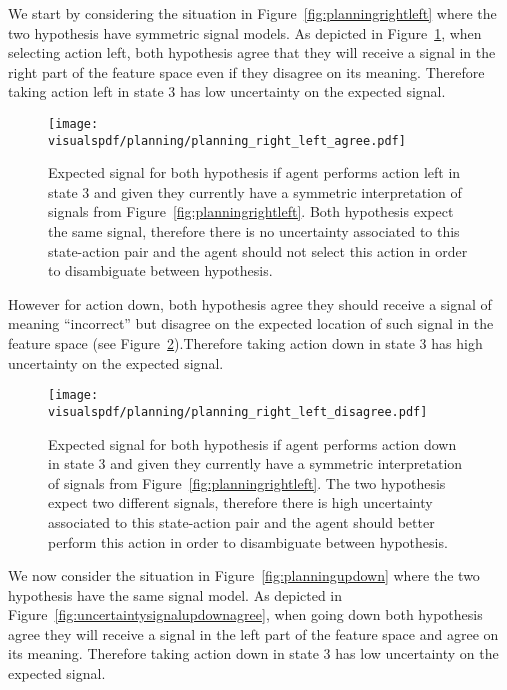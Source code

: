 We start by considering the situation in Figure~\ref{fig:planningrightleft} where the two hypothesis have symmetric signal models. As depicted in Figure~\ref{fig:uncertaintysignalrightleftagree}, when selecting action left, both hypothesis agree that they will receive a signal in the right part of the feature space even if they disagree on its meaning. Therefore taking action left in state 3 has low uncertainty on the expected signal.

\begin{figure}[!ht]
  \centering
  \texttt{[image: \\visualspdf/planning/planning\_right\_left\_agree.pdf]}
  \caption{Expected signal for both hypothesis if agent performs action left in state 3 and given they currently have a symmetric interpretation of signals from Figure~\ref{fig:planningrightleft}. Both hypothesis expect the same signal, therefore there is no uncertainty associated to this state-action pair and the agent should not select this action in order to disambiguate between hypothesis.}
  \label{fig:uncertaintysignalrightleftagree}
\end{figure}

However for action down, both hypothesis agree they should receive a signal of meaning ``incorrect'' but disagree on the expected location of such signal in the feature space (see Figure~\ref{fig:uncertaintysignalrightleftdisagree}).Therefore taking action down in state 3 has high uncertainty on the expected signal.

\begin{figure}[!ht]
  \centering
  \texttt{[image: \\visualspdf/planning/planning\_right\_left\_disagree.pdf]}
  \caption{Expected signal for both hypothesis if agent performs action down in state 3 and given they currently have a symmetric interpretation of signals from Figure~\ref{fig:planningrightleft}. The two hypothesis expect two different signals, therefore there is high uncertainty associated to this state-action pair and the agent should better perform this action in order to disambiguate between hypothesis.}
  \label{fig:uncertaintysignalrightleftdisagree}
\end{figure}


We now consider the situation in Figure~\ref{fig:planningupdown} where the two hypothesis have the same signal model. As depicted in Figure~\ref{fig:uncertaintysignalupdownagree}, when going down both hypothesis agree they will receive a signal in the left part of the feature space and agree on its meaning. Therefore taking action down in state 3 has low uncertainty on the expected signal.

